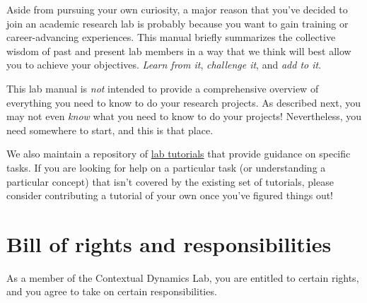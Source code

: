 \documentclass{tufte-book} %
\begin{document}


Aside from pursuing your own curiosity, a major reason that you've
decided to join an academic research lab is probably because you want
to gain training or career-advancing experiences.  This manual briefly
summarizes the collective wisdom of past and present lab members in a
way that we think will best allow you to achieve your objectives.
\textit{Learn from it}, \textit{challenge it}, and \textit{add to it}.


\noindent This lab manual is \textit{not} intended to provide a
comprehensive overview of everything you need to know to do your
research projects.  As described next, you may not even \textit{know}
what you need to know to do your projects!  Nevertheless, you need
somewhere to start, and this is that place.

We also maintain a repository of
\href{https://github.com/ContextLab/CDL-tutorials}{lab tutorials} that
provide guidance on specific tasks.  If you are looking for help on a
particular task (or understanding a particular concept) that isn't
covered by the existing set of tutorials, please consider contributing
a tutorial of your own once you've figured things out!


\chapter{Bill of rights and responsibilities}\label{ch:billofrights}
  As a member of the
Contextual Dynamics Lab, you are entitled to certain rights, and you
agree to take on certain responsibilities.

\end{document}
